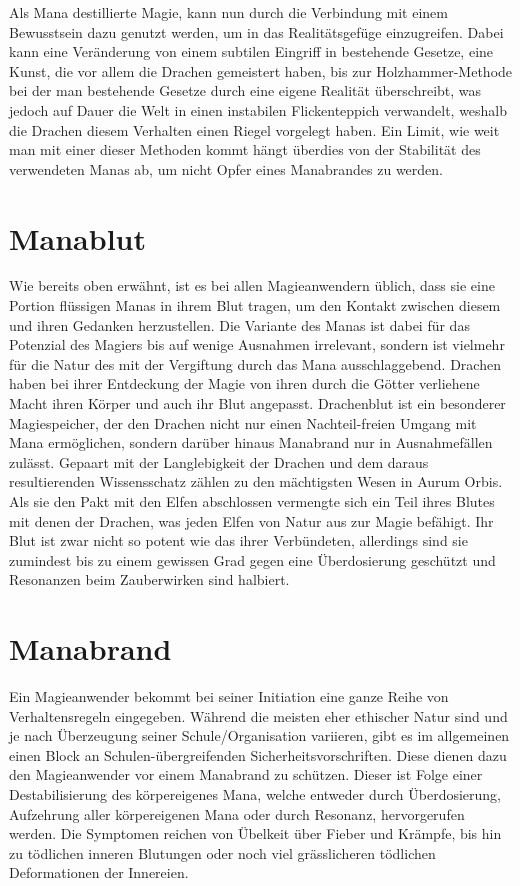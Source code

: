 \documentclass[a4paper,12pt,oneside]{book}
\begin{document}
Als Mana destillierte Magie, kann nun durch die Verbindung mit einem Bewusstsein dazu genutzt werden, um in das Realitätsgefüge einzugreifen. Dabei kann eine Veränderung von einem subtilen Eingriff in bestehende Gesetze, eine Kunst, die vor allem die Drachen gemeistert haben, bis zur Holzhammer-Methode bei der man bestehende Gesetze durch eine eigene Realität überschreibt, was jedoch auf Dauer die Welt in einen instabilen Flickenteppich verwandelt, weshalb die Drachen diesem Verhalten einen Riegel vorgelegt haben. Ein Limit, wie weit man mit einer dieser Methoden kommt hängt überdies von der Stabilität des verwendeten Manas ab, um nicht Opfer eines Manabrandes zu werden.

\section{Manablut}
Wie bereits oben erwähnt, ist es bei allen Magieanwendern üblich, dass sie eine Portion flüssigen Manas in ihrem Blut tragen, um den Kontakt zwischen diesem und ihren Gedanken herzustellen. Die Variante des Manas ist dabei für das Potenzial des Magiers bis auf wenige Ausnahmen irrelevant, sondern ist vielmehr für die Natur des mit der Vergiftung durch das Mana ausschlaggebend. Drachen haben bei ihrer Entdeckung der Magie von ihren durch die Götter verliehene Macht ihren Körper und auch ihr Blut angepasst. Drachenblut ist ein besonderer Magiespeicher, der den Drachen nicht nur einen Nachteil-freien Umgang mit Mana ermöglichen, sondern darüber hinaus Manabrand nur in Ausnahmefällen zulässt. Gepaart mit der Langlebigkeit der Drachen und dem daraus resultierenden Wissensschatz zählen zu den mächtigsten Wesen in Aurum Orbis. Als sie den Pakt mit den Elfen abschlossen vermengte sich ein Teil ihres Blutes mit denen der Drachen, was jeden Elfen von Natur aus zur Magie befähigt. Ihr Blut ist zwar nicht so potent wie das ihrer Verbündeten, allerdings sind sie zumindest bis zu einem gewissen Grad gegen eine Überdosierung geschützt und Resonanzen beim Zauberwirken sind halbiert.

\section{Manabrand}
Ein Magieanwender bekommt bei seiner Initiation eine ganze Reihe von Verhaltensregeln eingegeben. Während die meisten eher ethischer Natur sind und je nach Überzeugung seiner Schule/Organisation variieren, gibt es im allgemeinen einen Block an Schulen-übergreifenden Sicherheitsvorschriften. Diese dienen dazu den Magieanwender vor einem Manabrand zu schützen. Dieser ist Folge einer Destabilisierung des körpereigenes Mana, welche entweder durch Überdosierung, Aufzehrung aller körpereigenen Mana oder durch Resonanz, hervorgerufen werden. Die Symptomen reichen von Übelkeit über Fieber und Krämpfe, bis hin zu tödlichen inneren Blutungen oder noch viel grässlicheren tödlichen Deformationen der Innereien.
\end{document}

